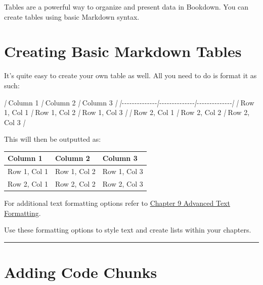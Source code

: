 \documentclass[
]{book}
\newenvironment{Shaded}{\begin{snugshade}}{\end{snugshade}}
\newcommand{\NormalTok}[1]{#1}
\newcommand{\PreprocessorTok}[1]{\textcolor[rgb]{0.56,0.35,0.01}{\textit{#1}}}
\theoremstyle{definition}
\theoremstyle{definition}
\theoremstyle{definition}
\theoremstyle{definition}
\theoremstyle{remark}
\begin{document}
Tables are a powerful way to organize and present data in Bookdown. You can create tables using basic Markdown syntax.

\section{Creating Basic Markdown Tables}\label{creating-basic-markdown-tables}

It's quite easy to create your own table as well. All you need to do is format it as such:

\begin{Shaded}
\begin{Highlighting}[]
\PreprocessorTok{|}\NormalTok{ Column 1     }\PreprocessorTok{|}\NormalTok{ Column 2     }\PreprocessorTok{|}\NormalTok{ Column 3     }\PreprocessorTok{|}
\PreprocessorTok{|{-}{-}{-}{-}{-}{-}{-}{-}{-}{-}{-}{-}{-}{-}|{-}{-}{-}{-}{-}{-}{-}{-}{-}{-}{-}{-}{-}{-}|{-}{-}{-}{-}{-}{-}{-}{-}{-}{-}{-}{-}{-}{-}|}
\PreprocessorTok{|}\NormalTok{ Row 1, Col 1 }\PreprocessorTok{|}\NormalTok{ Row 1, Col 2 }\PreprocessorTok{|}\NormalTok{ Row 1, Col 3 }\PreprocessorTok{|}
\PreprocessorTok{|}\NormalTok{ Row 2, Col 1 }\PreprocessorTok{|}\NormalTok{ Row 2, Col 2 }\PreprocessorTok{|}\NormalTok{ Row 2, Col 3 }\PreprocessorTok{|}
\end{Highlighting}
\end{Shaded}

This will then be outputted as:

\begin{longtable}[]{@{}lll@{}}
\toprule\noalign{}
Column 1 & Column 2 & Column 3 \\
\midrule\noalign{}
\endhead
\bottomrule\noalign{}
\endlastfoot
Row 1, Col 1 & Row 1, Col 2 & Row 1, Col 3 \\
Row 2, Col 1 & Row 2, Col 2 & Row 2, Col 3 \\
\end{longtable}

For additional text formatting options refer to \hyperref[markdown-advanced]{Chapter 9 Advanced Text Formatting}.

Use these formatting options to style text and create lists within your chapters.

\begin{center}\rule{0.5\linewidth}{0.5pt}\end{center}

\section{Adding Code Chunks}\label{adding-code-chunks}
\end{document}
